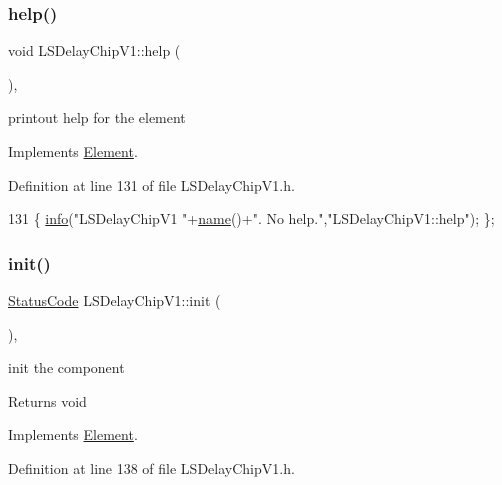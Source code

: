 \subsubsection{\texorpdfstring{help()}{help()}}
{\footnotesize\ttfamily void L\+S\+Delay\+Chip\+V1\+::help (\begin{DoxyParamCaption}{ }\end{DoxyParamCaption})\hspace{0.3cm}{\ttfamily [inline]}, {\ttfamily [virtual]}}

printout help for the element 

Implements \hyperlink{classElement_a32c0de27acb08e17251cef88c3e9303a}{Element}.



Definition at line 131 of file L\+S\+Delay\+Chip\+V1.\+h.


\begin{DoxyCode}
131 \{ \hyperlink{classObject_a644fd329ea4cb85f54fa6846484b84a8}{info}(\textcolor{stringliteral}{"LSDelayChipV1 "}+\hyperlink{classObject_a300f4c05dd468c7bb8b3c968868443c1}{name}()+\textcolor{stringliteral}{". No help."},\textcolor{stringliteral}{"LSDelayChipV1::help"}); \};
\end{DoxyCode}
\mbox{\label{classLSDelayChipV1_af8bc9c84a1b65cbc2176fdbc349e829c}} 
\subsubsection{\texorpdfstring{init()}{init()}}
{\footnotesize\ttfamily \hyperlink{classStatusCode}{Status\+Code} L\+S\+Delay\+Chip\+V1\+::init (\begin{DoxyParamCaption}{ }\end{DoxyParamCaption})\hspace{0.3cm}{\ttfamily [inline]}, {\ttfamily [virtual]}}

init the component

\begin{DoxyReturn}{Returns}
void 
\end{DoxyReturn}


Implements \hyperlink{classElement_af42754b5cabc198869222725218d695c}{Element}.



Definition at line 138 of file L\+S\+Delay\+Chip\+V1.\+h.




